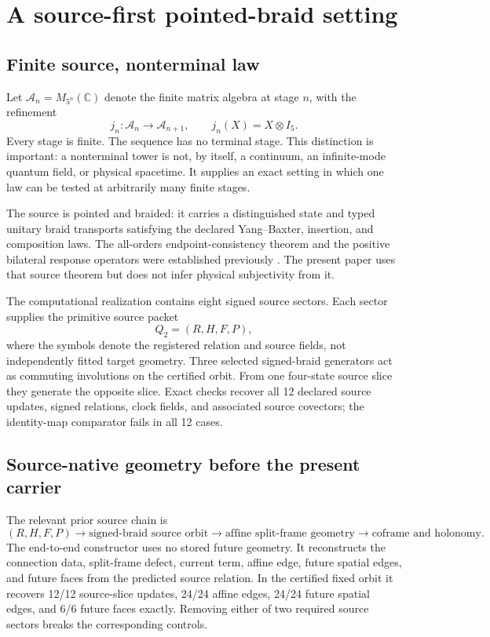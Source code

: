 \documentclass[11pt]{article}
\theoremstyle{definition}
\theoremstyle{remark}
\newcommand{\cA}{\mathcal{A}}
\begin{document}
\section{A source-first pointed-braid setting}

\subsection{Finite source, nonterminal law}

Let $\cA_n=M_{5^n}(\mathbb C)$ denote the finite matrix algebra at stage $n$, with the refinement
\begin{equation}\label{eq:refinement}
 j_n:\cA_n\longrightarrow\cA_{n+1},\qquad j_n(X)=X\otimes I_5.
\end{equation}
Every stage is finite. The sequence has no terminal stage. This distinction is important: a nonterminal tower is not, by itself, a continuum, an infinite-mode quantum field, or physical spacetime. It supplies an exact setting in which one law can be tested at arbitrarily many finite stages.

The source is pointed and braided: it carries a distinguished state and typed unitary braid transports satisfying the declared Yang--Baxter, insertion, and composition laws. The all-orders endpoint-consistency theorem and the positive bilateral response operators were established previously \cite{watanabe2026braid}. The present paper uses that source theorem but does not infer physical subjectivity from it.

The computational realization contains eight signed source sectors. Each sector supplies the primitive source packet
\begin{equation}\label{eq:sourcepacket}
 Q_2=(R,H,F,P),
\end{equation}
where the symbols denote the registered relation and source fields, not independently fitted target geometry. Three selected signed-braid generators act as commuting involutions on the certified orbit. From one four-state source slice they generate the opposite slice. Exact checks recover all 12 declared source updates, signed relations, clock fields, and associated source covectors; the identity-map comparator fails in all 12 cases.

\subsection{Source-native geometry before the present carrier}

The relevant prior source chain is
\begin{equation}\label{eq:sourcechain}
 (R,H,F,P)
 \longrightarrow \text{signed-braid source orbit}
 \longrightarrow \text{affine split-frame geometry}
 \longrightarrow \text{coframe and holonomy}.
\end{equation}
The end-to-end constructor uses no stored future geometry. It reconstructs the connection data, split-frame defect, current term, affine edge, future spatial edges, and future faces from the predicted source relation. In the certified fixed orbit it recovers 12/12 source-slice updates, 24/24 affine edges, 24/24 future spatial edges, and 6/6 future faces exactly. Removing either of two required source sectors breaks the corresponding controls.
\end{document}
